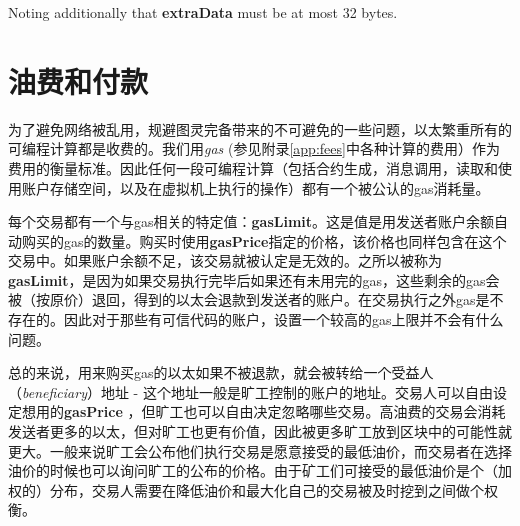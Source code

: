 \documentclass[UTF8,nofonts]{ctexart}
\begin{document}
\begin{multicols}{2}
Noting additionally that \textbf{extraData} must be at most 32 bytes.


\section{油费和付款} \label{ch:payment}

为了避免网络被乱用，规避图灵完备带来的不可避免的一些问题，以太繁重所有的可编程计算都是收费的。我们用\textit{gas} (参见附录\ref{app:fees}中各种计算的费用）作为费用的衡量标准。因此任何一段可编程计算（包括合约生成，消息调用，读取和使用账户存储空间，以及在虚拟机上执行的操作）都有一个被公认的gas消耗量。

每个交易都有一个与gas相关的特定值：\textbf{gasLimit}。这是值是用发送者账户余额自动购买的gas的数量。购买时使用\textbf{gasPrice}指定的价格，该价格也同样包含在这个交易中。如果账户余额不足，该交易就被认定是无效的。之所以被称为\textbf{gasLimit}，是因为如果交易执行完毕后如果还有未用完的gas，这些剩余的gas会被（按原价）退回，得到的以太会退款到发送者的账户。在交易执行之外gas是不存在的。因此对于那些有可信代码的账户，设置一个较高的gas上限并不会有什么问题。



总的来说，用来购买gas的以太如果不被退款，就会被转给一个受益人（\textit{beneficiary}）地址 - 这个地址一般是旷工控制的账户的地址。交易人可以自由设定想用的\textbf{gasPrice} ，但旷工也可以自由决定忽略哪些交易。高油费的交易会消耗发送者更多的以太，但对旷工也更有价值，因此被更多旷工放到区块中的可能性就更大。一般来说旷工会公布他们执行交易是愿意接受的最低油价，而交易者在选择油价的时候也可以询问旷工的公布的价格。由于矿工们可接受的最低油价是个（加权的）分布，交易人需要在降低油价和最大化自己的交易被及时挖到之间做个权衡。



\end{multicols}
\end{document}
